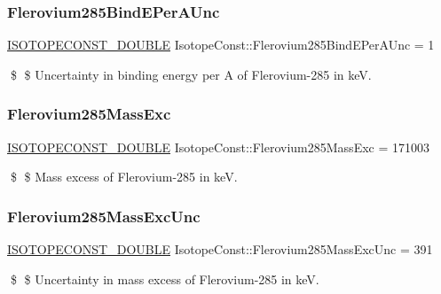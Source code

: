 \subsubsection{\texorpdfstring{Flerovium285\+Bind\+E\+Per\+A\+Unc}{Flerovium285BindEPerAUnc}}
{\footnotesize\ttfamily \mbox{\hyperlink{group___isotope_const-_macros_ga8f45a7272ce02c0b4c65c44636ed719a}{I\+S\+O\+T\+O\+P\+E\+C\+O\+N\+S\+T\+\_\+\+D\+O\+U\+B\+LE}} Isotope\+Const\+::\+Flerovium285\+Bind\+E\+Per\+A\+Unc = 1}

\$ \$ Uncertainty in binding energy per A of Flerovium-\/285 in keV. \mbox{\label{group___isotope_const-_flerovium-_fl285_gac79f5db765e9539f0f909e705a62776f}} 
\subsubsection{\texorpdfstring{Flerovium285\+Mass\+Exc}{Flerovium285MassExc}}
{\footnotesize\ttfamily \mbox{\hyperlink{group___isotope_const-_macros_ga8f45a7272ce02c0b4c65c44636ed719a}{I\+S\+O\+T\+O\+P\+E\+C\+O\+N\+S\+T\+\_\+\+D\+O\+U\+B\+LE}} Isotope\+Const\+::\+Flerovium285\+Mass\+Exc = 171003}

\$ \$ Mass excess of Flerovium-\/285 in keV. \mbox{\label{group___isotope_const-_flerovium-_fl285_ga9d193b22a78049bef9cb75db5c99d982}} 
\subsubsection{\texorpdfstring{Flerovium285\+Mass\+Exc\+Unc}{Flerovium285MassExcUnc}}
{\footnotesize\ttfamily \mbox{\hyperlink{group___isotope_const-_macros_ga8f45a7272ce02c0b4c65c44636ed719a}{I\+S\+O\+T\+O\+P\+E\+C\+O\+N\+S\+T\+\_\+\+D\+O\+U\+B\+LE}} Isotope\+Const\+::\+Flerovium285\+Mass\+Exc\+Unc = 391}

\$ \$ Uncertainty in mass excess of Flerovium-\/285 in keV. \mbox{\label{group___isotope_const-_flerovium-_fl285_ga71df69560250236ba177b36fadae332b}} 
